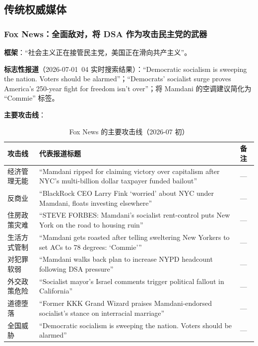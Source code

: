 \documentclass[12pt,a4paper]{ctexart}
\begin{document}
\subsection{传统权威媒体}

\subsubsection{Fox News：全面敌对，将 DSA 作为攻击民主党的武器}

\textbf{框架}：``社会主义正在接管民主党，美国正在滑向共产主义''。

\textbf{标志性报道}（2026-07-01~04 实时搜索结果）：``Democratic socialism is sweeping the nation. Voters should be alarmed''；``Democrats' socialist surge proves America's 250-year fight for freedom isn't over''；将 Mamdani 的空调建议简化为 ``Commie'' 标签。

\textbf{主要攻击线}：

\begin{table}[h]
\centering
\caption{Fox News 的主要攻击线（2026-07 初）}
\begin{tabular}{@{}lp{4.2cm}p{8.2cm}@{}}
\toprule
\textbf{攻击线} & \textbf{代表报道标题} & \textbf{备注} \\
\midrule
经济管理无能 & ``Mamdani ripped for claiming victory over capitalism after NYC's multi-billion dollar taxpayer funded bailout'' & --- \\
反商业 & ``BlackRock CEO Larry Fink `worried' about NYC under Mamdani, floats investing elsewhere'' & --- \\
住房政策灾难 & ``STEVE FORBES: Mamdani's socialist rent-control puts New York on the road to housing ruin'' & --- \\
生活方式管制 & ``Mamdani gets roasted after telling sweltering New Yorkers to set ACs to 78 degrees: `Commie''' & --- \\
对犯罪软弱 & ``Mamdani walks back plan to increase NYPD headcount following DSA pressure'' & --- \\
外交政策危险 & ``Socialist mayor's Israel comments trigger political fallout in California'' & --- \\
道德堕落 & ``Former KKK Grand Wizard praises Mamdani-endorsed socialist's stance on interracial marriage'' & --- \\
全国威胁 & ``Democratic socialism is sweeping the nation. Voters should be alarmed'' & --- \\
\bottomrule
\end{tabular}
\end{table}
\end{document}
